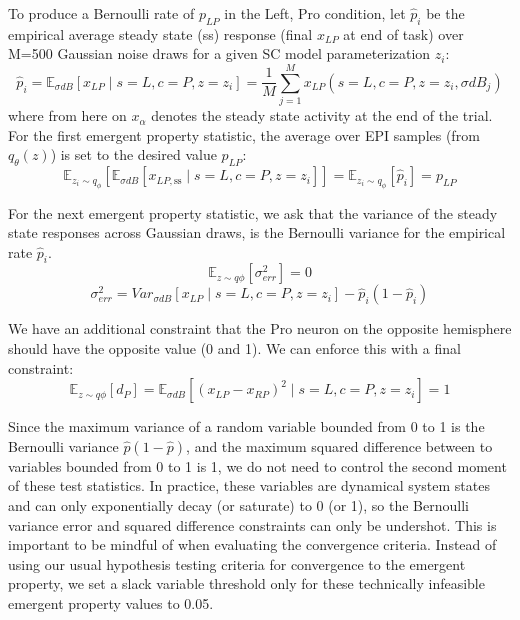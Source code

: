 \documentclass[11pt]{article}
\begin{document}
To produce a Bernoulli rate of $p_{LP}$ in the Left, Pro condition, let $\hat{p}_i$ be the empirical average steady state (ss) response (final $x_{LP}$ at end of task) over M=500 Gaussian noise draws for a given SC model parameterization $z_i$:
\begin{equation}
 \hat{p}_i = \mathbb{E}_{\sigma dB} \left[ x_{LP} \mid s=L, c=P, z=z_i \right] = \frac{1}{M}\sum_{j=1}^M x_{LP}(s=L, c=P, z=z_i, \sigma dB_j)
 \end{equation}
where from here on $x_\alpha$ denotes the steady state activity at the end of the trial.
For the first emergent property statistic, the average over EPI samples (from $q_\theta(z)$) is set to the desired value $p_{LP}$:
\begin{equation}
\mathbb{E}_{z_i \sim q_\phi} \left[ \mathbb{E}_{\sigma dB} \left[ x_{LP,\text{ss}} \mid s=L, c=P, z=z_i \right] \right] = \mathbb{E}_{z_i \sim q_\phi} \left[ \hat{p}_i \right] = p_{LP}
\end{equation}

For the next emergent property statistic, we ask that the variance of the steady state responses across Gaussian draws, is the Bernoulli variance for the empirical rate $\hat{p}_i$.
\begin{equation}
\mathbb{E}_{z \sim q\phi} \left[ \sigma^2_{err} \right] = 0
\end{equation}
\begin{equation}
\sigma^2_{err} = Var_{\sigma dB} \left[ x_{LP} \mid s=L, c=P, z=z_i \right] - \hat{p}_i(1 - \hat{p}_i)
\end{equation}

We have an additional constraint that the Pro neuron on the opposite hemisphere should have the opposite value (0 and 1).  We can enforce this with a final constraint:
\begin{equation}
\mathbb{E}_{z \sim q\phi} \left[ d_P \right] = \mathbb{E}_{\sigma dB} \left[ (x_{LP} - x_{RP})^2  \mid s=L, c=P, z=z_i \right] = 1
\end{equation}

Since the maximum variance of a random variable bounded from 0 to 1 is the Bernoulli variance $\hat{p}(1-\hat{p})$, and the maximum squared difference between to variables bounded from 0 to 1 is 1, we do not need to control the second moment of these test statistics.  In practice, these variables are dynamical system states and can only exponentially decay (or saturate) to 0 (or 1), so the Bernoulli variance error and squared difference constraints can only be undershot.  This is important to be mindful of when evaluating the convergence criteria.  Instead of using our usual hypothesis testing criteria for convergence to the emergent property, we set a slack variable threshold only for these technically infeasible emergent property values to 0.05.
\end{document}
